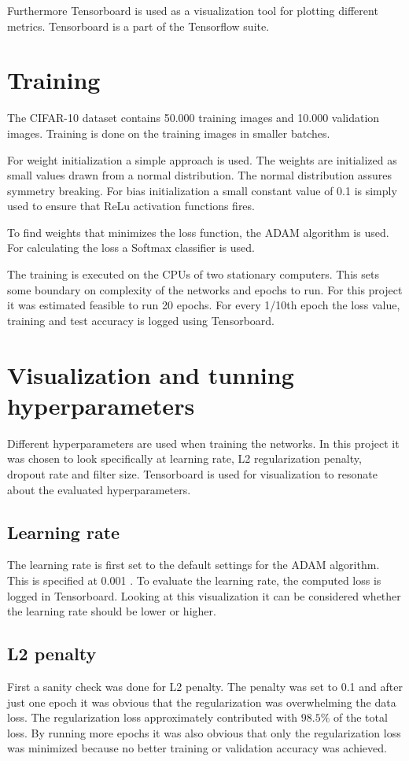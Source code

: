 Furthermore Tensorboard is used as a visualization tool for plotting different metrics. Tensorboard is a part of the Tensorflow suite.

\section{Training}
The CIFAR-10 dataset contains 50.000 training images and 10.000 validation images. Training is done on the training images in smaller batches. 

For weight initialization a simple approach is used. The weights are initialized as small values drawn from a normal distribution. The normal distribution assures symmetry breaking. For bias initialization a small constant value of 0.1 is simply used to ensure that ReLu activation functions fires.

To find weights that minimizes the loss function, the ADAM algorithm is used. For calculating the loss a Softmax classifier is used.

The training is executed on the CPUs of two stationary computers. This sets some boundary on complexity of the networks and epochs to run. For this project it was estimated feasible to run 20 epochs. For every 1/10th epoch the loss value, training and test accuracy is logged using Tensorboard.

\section{Visualization and tunning hyperparameters}
Different hyperparameters are used when training the networks. In this project it was chosen to look specifically at learning rate, L2 regularization penalty, dropout rate and filter size. Tensorboard is used for visualization to resonate about the evaluated hyperparameters.

\subsection{Learning rate}
The learning rate is first set to the default settings for the ADAM algorithm. This is specified at 0.001 \citep{ADAM}. To evaluate the learning rate, the computed loss is logged in Tensorboard. Looking at this visualization it can be considered whether the learning rate should be lower or higher.


\subsection{L2 penalty}
First a sanity check was done for L2 penalty. The penalty was set to 0.1 and after just one epoch it was obvious that the regularization was overwhelming the data loss. The regularization loss approximately contributed with $98.5\%$ of the total loss. By running more epochs it was also obvious that only the regularization loss was minimized because no better training or validation accuracy was achieved.

